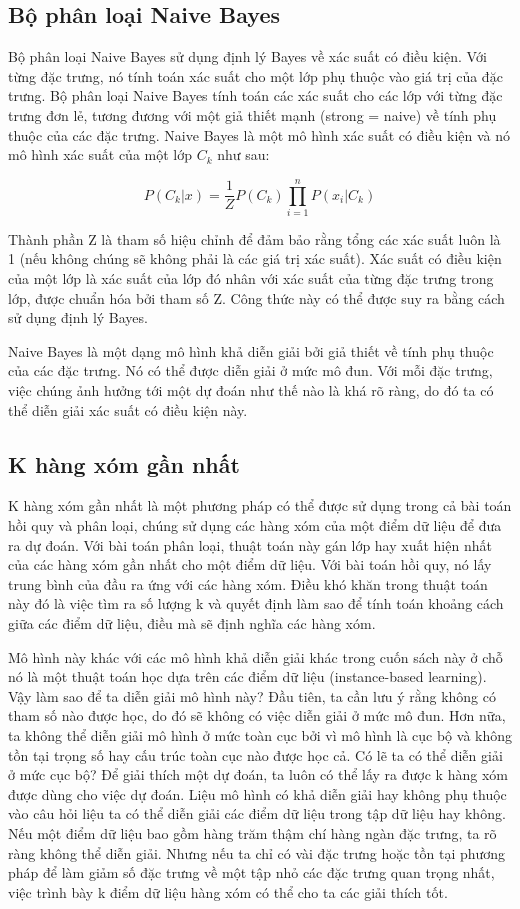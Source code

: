 \subsection{Bộ phân loại Naive Bayes}

Bộ phân loại Naive Bayes sử dụng định lý Bayes về xác suất có điều kiện. Với từng đặc trưng, nó tính toán xác suất cho một lớp phụ thuộc vào giá trị của đặc trưng. Bộ phân loại Naive Bayes tính toán các xác suất cho các lớp với từng đặc trưng đơn lẻ, tương đương với một giả thiết mạnh (strong = naive) về tính phụ thuộc  của các đặc trưng. Naive Bayes là một mô hình xác suất có điều kiện và nó mô hình xác suất của một lớp $C_k$ như sau:

$$P(C_k|x)=\frac{1}{Z}P(C_k)\prod_{i=1}^n{}P(x_i|C_k)$$

Thành phần Z là tham số hiệu chỉnh để đảm bảo rằng tổng các xác suất luôn là 1 (nếu không chúng sẽ không phải là các giá trị xác suất). Xác suất có điều kiện của một lớp là xác suất của lớp đó nhân với xác suất của từng đặc trưng trong lớp, được chuẩn hóa bởi tham số Z. Công thức này có thể được suy ra bằng cách sử dụng định lý Bayes.

Naive Bayes là một dạng mô hình khả diễn giải bởi giả thiết về tính phụ thuộc của các đặc trưng. Nó có thể được diễn giải ở mức mô đun. Với mỗi đặc trưng,  việc chúng ảnh hưởng tới một dự đoán như thế nào là khá rõ ràng, do đó ta có thể diễn giải xác suất có điều kiện này.

\subsection{K hàng xóm gần nhất}

K hàng xóm gần nhất là một phương pháp có thể được sử dụng trong cả bài toán hồi quy và phân loại, chúng sử dụng các hàng xóm của một điểm dữ liệu để đưa ra dự đoán. Với bài toán phân loại, thuật toán này gán lớp hay xuất hiện nhất của các hàng xóm gần nhất cho một điểm dữ liệu. Với bài toán hồi quy, nó lấy trung bình của đầu ra ứng với các hàng xóm. Điều khó khăn trong thuật toán này đó là việc tìm ra số lượng k và quyết định làm sao để tính toán khoảng cách giữa các điểm dữ liệu, điều mà sẽ định nghĩa các hàng xóm.

Mô hình này khác với các mô hình khả diễn giải khác trong cuốn sách này ở chỗ nó là một thuật toán học dựa trên các điểm dữ liệu (instance-based learning). Vậy làm sao để ta diễn giải mô hình này? Đầu tiên, ta cần lưu ý rằng không có tham số nào được học, do đó sẽ không có việc diễn giải ở mức mô đun. Hơn nữa, ta không thể diễn giải mô hình ở mức toàn cục bởi vì mô hình là cục bộ và không tồn tại trọng số hay cấu trúc toàn cục nào được học cả. Có lẽ ta có thể diễn giải ở mức cục bộ? Để giải thích một dự đoán, ta luôn có thể lấy ra được k hàng xóm được dùng cho việc dự đoán. Liệu mô hình có khả diễn giải hay không phụ thuộc vào câu hỏi liệu ta có thể diễn giải các điểm dữ liệu trong tập dữ liệu hay không. Nếu một điểm dữ liệu bao gồm hàng trăm thậm chí hàng ngàn đặc trưng, ta rõ ràng không thể diễn giải. Nhưng nếu ta chỉ có vài đặc trưng hoặc tồn tại phương pháp để làm giảm số đặc trưng về một tập nhỏ các đặc trưng quan trọng nhất, việc trình bày k điểm dữ liệu hàng xóm có thể cho ta các giải thích tốt.